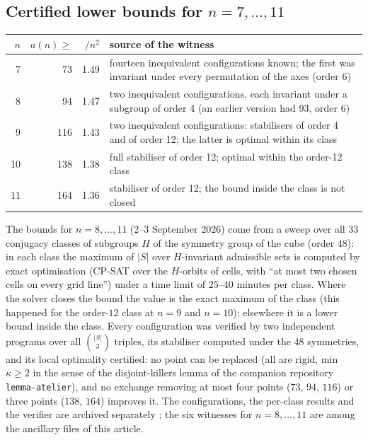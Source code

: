 \documentclass[11pt,a4paper]{article}
\begin{document}
\subsection{Certified lower bounds for \texorpdfstring{$n=7,\dots,11$}{n = 7, ..., 11}}\label{s:lb3}
\begin{center}\begin{tabular}{rrrp{8.6cm}}\toprule
$n$ & $a(n)\ge$ & $/n^2$ & source of the witness\\\midrule
7 & 73 & 1.49 & fourteen inequivalent configurations known; the first was invariant under every permutation of the axes (order 6)\\
8 & 94 & 1.47 & two inequivalent configurations, each invariant under a subgroup of order 4 (an earlier version had $93$, order 6)\\
9 & 116 & 1.43 & two inequivalent configurations: stabilisers of order 4 and of order 12; the latter is optimal within its class\\
10 & 138 & 1.38 & full stabiliser of order 12; optimal within the order-12 class\\
11 & 164 & 1.36 & stabiliser of order 12; the bound inside the class is not closed\\\bottomrule
\end{tabular}\end{center}
The bounds for $n=8,\dots,11$ (2--3 September 2026) come from a sweep over all $33$ conjugacy
classes of subgroups $H$ of the symmetry group of the cube (order $48$): in each class the maximum of $|S|$
over $H$-invariant admissible sets is computed by exact optimisation (CP-SAT over the $H$-orbits of cells, with
``at most two chosen cells on every grid line'') under a time limit of $25$--$40$ minutes per class.  Where the
solver closes the bound the value is the exact maximum of the class (this happened for the order-$12$ class at
$n=9$ and $n=10$); elsewhere it is a lower bound inside the class.  Every configuration was verified by two
independent programs over all $\binom{|S|}{3}$ triples, its stabiliser computed under the $48$ symmetries, and
its local optimality certified: no point can be replaced (all are rigid, min $\kappa\ge2$ in the sense of the
disjoint-killers lemma of the companion repository \texttt{lemma-atelier}), and no exchange removing at most
four points ($73$, $94$, $116$) or three points ($138$, $164$) improves it.  The configurations, the per-class
results and the verifier are archived separately \cite{Witnesses}; the six witnesses for $n=8,\dots,11$ are
among the ancillary files of this article.
\end{document}
